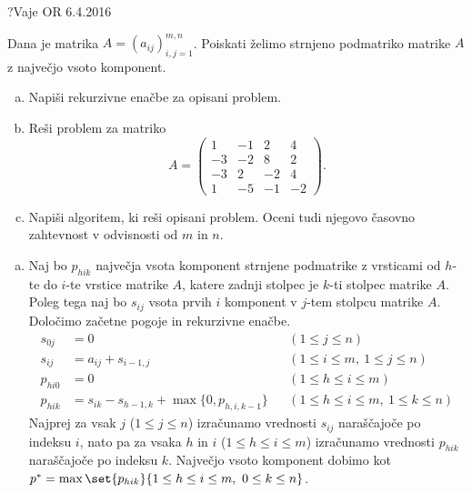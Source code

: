 \begin{naloga}{?}{Vaje OR 6.4.2016}
\begin{vprasanje}
Dana je matrika $A = (a_{ij})_{i,j=1}^{m,n}$.
Poiskati želimo strnjeno podmatriko matrike $A$
z največjo vsoto komponent.
\begin{enumerate}[(a)]
\item Napiši rekurzivne enačbe za opisani problem.
\item Reši problem za matriko
$$
A = \begin{pmatrix}
 1 & -1 &  2 &  4 \\
-3 & -2 &  8 &  2 \\
-3 &  2 & -2 &  4 \\
 1 & -5 & -1 & -2
\end{pmatrix} .
$$
\item Napiši algoritem, ki reši opisani problem.
Oceni tudi njegovo časovno zahtevnost v odvisnosti od $m$ in $n$.
\end{enumerate}
\end{vprasanje}

\begin{odgovor}
\begin{enumerate}[(a)]
\item Naj bo $p_{hik}$ največja vsota komponent strnjene podmatrike
z vrsticami od $h$-te do $i$-te vrstice matrike $A$,
katere zadnji stolpec je $k$-ti stolpec matrike $A$.
Poleg tega naj bo $s_{ij}$ vsota prvih $i$ komponent
v $j$-tem stolpcu matrike $A$.
Določimo začetne pogoje in rekurzivne enačbe.
\begin{align*}
s_{0j}  &= 0 && (1 \le j \le n) \\
s_{ij}  &= a_{ij} + s_{i-1,j} && (1 \le i \le m, \ 1 \le j \le n) \\
p_{hi0} &= 0 && (1 \le h \le i \le m) \\
p_{hik} &= s_{ik} - s_{h-1,k} + \max\{0, p_{h,i,k-1}\} &&
(1 \le h \le i \le m, \ 1 \le k \le n)
\end{align*}
Najprej za vsak $j$ ($1 \le j \le n$)
izračunamo vrednosti $s_{ij}$ naraščajoče po indeksu $i$,
nato pa za vsaka $h$ in $i$ ($1 \le h \le i \le m$)
izračunamo vrednosti $p_{hik}$ naraščajoče po indeksu $k$.
Največjo vsoto komponent dobimo kot
$p^* = \max\set{p_{hik}}{1 \le h \le i \le m, \ 0 \le k \le n}$.


\end{enumerate}
\end{odgovor}
\end{naloga}
